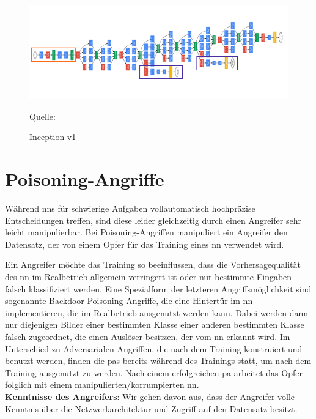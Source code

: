 \documentclass[twoside, 12pt,a4paper]{book}
\newcommand{\source}[1]{\caption*{\hfill Quelle: {#1}} }
\numberwithin{equation}{section}
\begin{document}
	\begin{figure}[ht]
		\centering
		
			\centering
			\includegraphics[width=.7\linewidth]{inception_v1_structure.png}
		
		\caption{Inception v1}
		\source{\cite{goingdeeperwithconvolutions}}
		
		\label{inception_v1_structure}
	\end{figure}
	
	\newpage
	\section{Poisoning-Angriffe} \label{chapter_poisoningattacks}
	Während \acp{nn} für schwierige Aufgaben vollautomatisch hochpräzise Entscheidungen treffen, sind diese leider gleichzeitig durch einen Angreifer sehr leicht manipulierbar. Bei Poisoning-Angriffen manipuliert ein Angreifer den Datensatz, der von einem Opfer für das Training eines \ac{nn} verwendet wird. 
	
	
	\noindent Ein Angreifer möchte das Training so beeinflussen, dass die Vorhersagequalität des \ac{nn} im Realbetrieb allgemein verringert ist oder nur bestimmte Eingaben falsch klassifiziert werden.
	Eine Spezialform der letzteren Angriffsmöglichkeit sind sogenannte Backdoor-Poisoning-Angriffe, die eine Hintertür im \ac{nn} implementieren, die im Realbetrieb ausgenutzt werden kann. Dabei werden dann nur diejenigen Bilder einer bestimmten Klasse einer anderen bestimmten Klasse falsch zugeordnet, die einen Auslöser besitzen, der vom \ac{nn} erkannt wird.
	Im Unterschied zu Adversarialen Angriffen, die nach dem Training konstruiert und benutzt werden, finden die \acp{pa} bereits während des Trainings statt, um nach dem Training ausgenutzt zu werden. Nach einem erfolgreichen \ac{pa} arbeitet das Opfer folglich mit einem manipulierten/korrumpierten \ac{nn}.\\
	
	\noindent\textbf{Kenntnisse des Angreifers}: Wir gehen davon aus, dass der Angreifer volle Kenntnis über die Netzwerkarchitektur und Zugriff auf den Datensatz besitzt.\\
	
\end{document}
